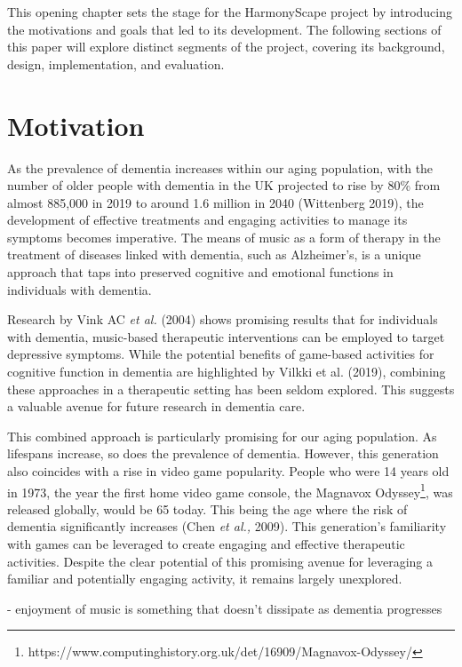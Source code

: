 \documentclass{l4proj}
\begin{document}
This opening chapter sets the stage for the HarmonyScape project by introducing the motivations and goals that led to its development. The following sections of this paper will explore distinct segments of the project, covering its background, design, implementation, and evaluation.

\section{Motivation}
As the prevalence of dementia increases within our aging population, with the number of older people with dementia in the UK projected to rise by 80\% from almost 885,000 in 2019 to around 1.6 million in 2040 (Wittenberg  2019), the development of effective treatments and engaging activities to manage its symptoms becomes imperative.  The means of music as a form of therapy in the treatment of diseases linked with dementia, such as Alzheimer's, is a unique approach that taps into preserved cognitive and emotional functions in individuals with dementia.

Research by Vink AC \emph{et al.} (2004) shows promising results that for individuals with dementia, music-based therapeutic interventions can be employed to target depressive symptoms. While the potential benefits of game-based activities for cognitive function in dementia are highlighted by Vilkki et al. (2019), combining these approaches in a therapeutic setting has been seldom explored. This suggests a valuable avenue for future research in dementia care.

This combined approach is particularly promising for our aging population. As lifespans increase, so does the prevalence of dementia. However, this generation also coincides with a rise in video game popularity. People who were 14 years old in 1973, the year the first home video game console, the Magnavox Odyssey\footnote{https://www.computinghistory.org.uk/det/16909/Magnavox-Odyssey/}, was released globally, would be 65 today. This being the age where the risk of dementia significantly increases (Chen \emph{et al.,} 2009). This generation's familiarity with games can be leveraged to create engaging and effective therapeutic activities. Despite the clear potential of this promising avenue for leveraging a familiar and potentially engaging activity, it remains largely unexplored.


- enjoyment of music is something that doesn't dissipate as dementia progresses
\end{document}
